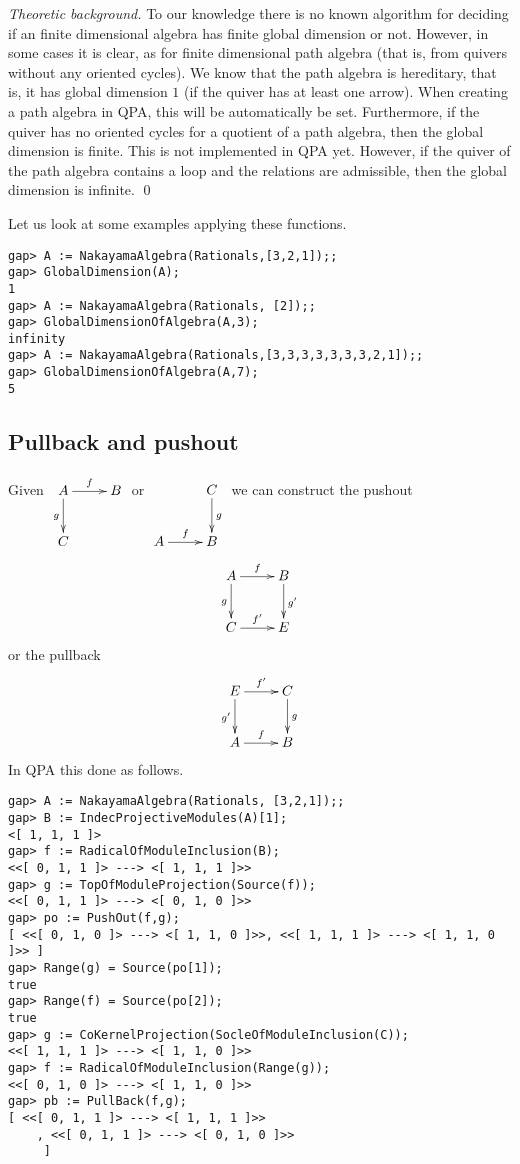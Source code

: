 \documentclass{amsart}
\theoremstyle{definition}
\theoremstyle{theoretic}
\newenvironment{theoback}
{\medskip\small\textit{Theoretic background.} }
{\qed\par\medskip}
\begin{document}
\begin{theoback}
  To our knowledge there is no known algorithm for deciding if an
  finite dimensional algebra has finite global dimension or not.
  However, in some cases it is clear, as for finite dimensional path
  algebra (that is, from quivers without any oriented cycles).  We
  know that the path algebra is hereditary, that is, it has global
  dimension $1$ (if the quiver has at least one arrow).  When creating
  a path algebra in QPA, this will be automatically be set.
  Furthermore, if the quiver has no oriented cycles for a quotient of
  a path algebra, then the global dimension is finite.  This is not
  implemented in QPA yet.  However, if the quiver of the path algebra
  contains a loop and the relations are admissible, then the global
  dimension is infinite.
\end{theoback}

Let us look at some examples applying these functions.
\begin{verbatim}
gap> A := NakayamaAlgebra(Rationals,[3,2,1]);;
gap> GlobalDimension(A);
1
gap> A := NakayamaAlgebra(Rationals, [2]);;
gap> GlobalDimensionOfAlgebra(A,3);
infinity
gap> A := NakayamaAlgebra(Rationals,[3,3,3,3,3,3,3,2,1]);;
gap> GlobalDimensionOfAlgebra(A,7);
5
\end{verbatim}

\subsection{Pullback and pushout}
Given $\xymatrix{A\ar[r]^f\ar[d]_g & B\\ C & }$ or $\xymatrix{ & C\ar[d]^g\\
  A\ar[r]^f & B}$
we can construct the pushout 
\[\xymatrix{A\ar[r]^f\ar[d]_g & B\ar[d]^{g'}\\ C\ar[r]^{f'} & E}\]
or the pullback 
\[\xymatrix{E\ar[r]^{f'}\ar[d]_{g'} & C\ar[d]^g\\ A\ar[r]^f & B}\]
In QPA this done as follows.
\begin{verbatim}
gap> A := NakayamaAlgebra(Rationals, [3,2,1]);;                       
gap> B := IndecProjectiveModules(A)[1];
<[ 1, 1, 1 ]>
gap> f := RadicalOfModuleInclusion(B);
<<[ 0, 1, 1 ]> ---> <[ 1, 1, 1 ]>>
gap> g := TopOfModuleProjection(Source(f));
<<[ 0, 1, 1 ]> ---> <[ 0, 1, 0 ]>>
gap> po := PushOut(f,g);
[ <<[ 0, 1, 0 ]> ---> <[ 1, 1, 0 ]>>, <<[ 1, 1, 1 ]> ---> <[ 1, 1, 0 ]>> ]
gap> Range(g) = Source(po[1]);
true
gap> Range(f) = Source(po[2]);
true
gap> g := CoKernelProjection(SocleOfModuleInclusion(C));
<<[ 1, 1, 1 ]> ---> <[ 1, 1, 0 ]>>
gap> f := RadicalOfModuleInclusion(Range(g));
<<[ 0, 1, 0 ]> ---> <[ 1, 1, 0 ]>>
gap> pb := PullBack(f,g);
[ <<[ 0, 1, 1 ]> ---> <[ 1, 1, 1 ]>>
    , <<[ 0, 1, 1 ]> ---> <[ 0, 1, 0 ]>>
     ]
\end{verbatim}
\end{document}
